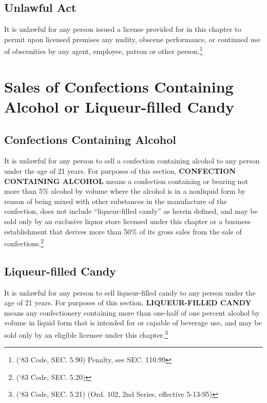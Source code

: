 \subsection{Unlawful Act}
It is unlawful for any person issued a license provided for in this chapter to permit upon licensed premises any nudity, obscene performance, or continued use of obscenities by any agent, employee, patron or other person.\footnote{(‘83 Code, SEC. 5.90)  Penalty, see SEC. 110.99}

\section{Sales of Confections Containing Alcohol or Liqueur-filled Candy}
\subsection{Confections Containing Alcohol}
It is unlawful for any person to sell a confection containing alcohol to any person under the age of 21 years.  For purposes of this section, \textbf{CONFECTION CONTAINING ALCOHOL} means a confection containing or bearing not more than 5\% alcohol by volume where the alcohol is in a nonliquid form by reason of being mixed with other substances in the manufacture of the confection, does not include “liqueur-filled candy” as herein defined, and may be sold only by an exclusive liquor store licensed under this chapter or a business establishment that derives more than 50\% of its gross sales from the sale of confections.\footnote{(‘83 Code, SEC. 5.20)}
\subsection{Liqueur-filled Candy}
It is unlawful for any person to sell liqueur-filled candy to any person under the age of 21 years.  For purposes of this section, \textbf{LIQUEUR-FILLED CANDY} means any confectionery containing more than one-half of one percent alcohol by volume in liquid form that is intended for or capable of beverage use, and may be sold only by an eligible licensee under this chapter.\footnote{(‘83 Code, SEC. 5.21)  (Ord. 102, 2nd Series, effective 5-13-95)}\\


\setcounter{section}{59}

